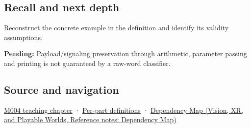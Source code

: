 \subsection{Recall and next depth}\label{appendix-d6607cc4c235-recall-and-next-depth}

Reconstruct the concrete example in the definition and identify its validity assumptions.

\textbf{Pending:} Payload/signaling preservation through arithmetic, parameter passing and printing is not guaranteed by a raw-word classifier.

\subsection{Source and navigation}\label{appendix-d6607cc4c235-source-and-navigation}

\hyperref[01-foundations-i-ch001-a-stretching-ruler-for-real-valued-quantities]{M004 teaching chapter} · \hyperref[appendix-fd090d982a15-m004---parts-61-76]{Per-part definitions} · \href{../07-Vision-XR-and-Playable-Worlds/main.pdf\#nameddest=appendix-4ad47bdd269a}{Dependency Map (Vision, XR, and Playable Worlds, Reference notes: Dependency Map)}
